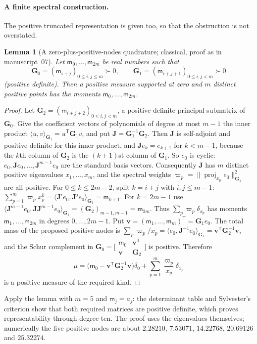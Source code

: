 \documentclass[11pt,letterpaper]{article}
\newtheorem{lemma}[theorem]{Lemma}
\theoremstyle{remark}\newtheorem{remark}[theorem]{Remark}
\newcounter{l7gtrsavedeq}
\begin{document}
\paragraph{A finite spectral construction.}
The positive truncated representation is given too, so that the
obstruction is not overstated.

\begin{lemma}[A zero-plus-positive-nodes quadrature; classical, proof as in manuscript~07]\label{l7g:hp:lem:quadrature}
Let $\mathsf m_0,\dots,\mathsf m_{2m}$ be real numbers such that
\[
 \mathbf G_0=(\mathsf m_{i+j})_{0\le i,j\le m}\succ0,
 \qquad \mathbf G_1=(\mathsf m_{i+j+1})_{0\le i,j<m}\succ0
\]
(positive definite). Then a positive measure supported at zero and $m$
distinct positive points has the moments $\mathsf m_0,\dots,\mathsf m_{2m}$.
\end{lemma}
\begin{proof}
Let $\mathbf G_2=(\mathsf m_{i+j+2})_{0\le i,j<m}$, a positive-definite
principal submatrix of $\mathbf G_0$. Give the coefficient vectors of
polynomials of degree at most $m-1$ the inner product
$\langle u,v\rangle_{\mathbf G_1}=u^{\mathsf T}\mathbf G_1v$, and put
$\mathbf J=\mathbf G_1^{-1}\mathbf G_2$. Then $\mathbf J$ is self-adjoint and
positive definite for this inner product, and $\mathbf Je_k=e_{k+1}$ for
$k<m-1$, because the $k$th column of $\mathbf G_2$ is the $(k+1)$st column
of $\mathbf G_1$. So $e_0$ is cyclic: $e_0,\mathbf Je_0,\dots,\mathbf
J^{m-1}e_0$ are the standard basis vectors. Consequently $\mathbf J$ has $m$
distinct positive eigenvalues $x_1,\dots,x_m$, and the spectral weights
$\varpi_p=\|\operatorname{proj}_{x_p}e_0\|_{\mathbf G_1}^2$ are all
positive. For $0\le k\le2m-2$, split $k=i+j$ with $i,j\le m-1$:
$\sum_{p=1}^m\varpi_px_p^k=\langle\mathbf J^ie_0,\mathbf J^je_0\rangle_{\mathbf
G_1}=\mathsf m_{k+1}$. For $k=2m-1$ use
$\langle\mathbf J^{m-1}e_0,\mathbf J\mathbf J^{m-1}e_0\rangle_{\mathbf G_1}
=(\mathbf G_2)_{m-1,m-1}=\mathsf m_{2m}$. Thus $\sum_p\varpi_p\delta_{x_p}$
has moments $\mathsf m_1,\dots,\mathsf m_{2m}$ in degrees $0,\dots,2m-1$.
Put $\mathbf v=(\mathsf m_1,\dots,\mathsf m_m)^{\mathsf T}=\mathbf G_1e_0$.
The total mass of the proposed positive nodes is
$\sum_p\varpi_p/x_p=\langle e_0,\mathbf J^{-1}e_0\rangle_{\mathbf G_1}
=\mathbf v^{\mathsf T}\mathbf G_2^{-1}\mathbf v$, and the Schur complement
in $\mathbf G_0=\bigl[\begin{smallmatrix}\mathsf m_0&\mathbf v^{\mathsf T}\\
\mathbf v&\mathbf G_2\end{smallmatrix}\bigr]$ is positive. Therefore
\[
 \mu=\bigl(\mathsf m_0-\mathbf v^{\mathsf T}\mathbf G_2^{-1}\mathbf v\bigr)\delta_0
 +\sum_{p=1}^m\frac{\varpi_p}{x_p}\delta_{x_p}
\]
is a positive measure of the required kind.
\end{proof}
Apply the lemma with $m=5$ and $\mathsf m_j=a_j$: the determinant table and
Sylvester's criterion show that both required matrices are positive
definite, which proves representability through degree ten. The proof uses
the eigenvalues themselves; numerically the five positive nodes are about
$2.28210$, $7.53071$, $14.22768$, $20.69126$ and $25.32274$.
\end{document}
